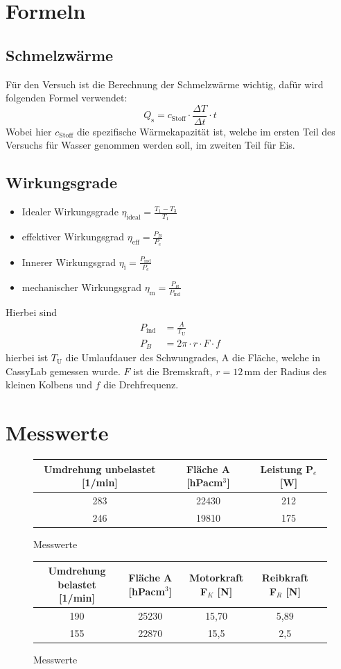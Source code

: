 \documentclass[fontsize=12pt]{scrartcl}
\begin{document}
\section{Formeln}

\subsection{Schmelzwärme}
Für den Versuch ist die Berechnung der Schmelzwärme wichtig, dafür wird folgenden Formel verwendet:
\begin{equation}
Q_{\text{s}} = c_{\text{Stoff}}\cdot \frac{\Delta T}{\Delta t} \cdot t
\end{equation}
Wobei hier $c_{\text{Stoff}}$ die spezifische Wärmekapazität ist, welche im ersten Teil des Versuchs für Wasser genommen werden soll, im zweiten Teil für Eis. 
\subsection{Wirkungsgrade}
\begin{itemize}
\item Idealer Wirkungsgrade $\eta_{\text{ideal}}= \frac{T_1 -T_3}{T_1}$
\item effektiver Wirkungsgrad $\eta_{\text{eff}}= \frac{P_B}{P_e}$
\item Innerer Wirkungsgrad $\eta_{\text{i}}=\frac{P_{\text{ind}}}{P_e}$
\item mechanischer Wirkungsgrad $\eta_{\text{m}} = \frac{P_B}{P_{\text{ind}}}$
\end{itemize}
Hierbei sind 
\begin{align*}
P_{\text{ind}}& = \frac{A}{T_{\text{U}}} \\
P_B &= 2\pi \cdot  r \cdot F \cdot f
\end{align*}
hierbei ist $T_{\text{U}}$ die Umlaufdauer des Schwungrades, A die Fläche, welche in CassyLab gemessen wurde. $F$ ist die Bremskraft, $r=12\,\text{mm}$ der Radius des kleinen Kolbens und $f$ die Drehfrequenz.
\newpage
\section{ Messwerte}
\begin{figure}[H]
\centering
\caption{Messwerte }
\begin{tabular}{|c|c|c|} \hline
Umdrehung unbelastet [1/min] & Fläche A [hPacm$^3$] & Leistung P$_e$ [W] \\ \hline
283 & 22430 & 212 \\ \hline
246 & 19810 & 175  \\ \hline
\end{tabular}				 
\end{figure}
\begin{figure}[H]
\centering
\caption{Messwerte }
\begin{tabular}{|c|c|c|c|c|} \hline
Umdrehung belastet [1/min] & Fläche A [hPacm$^3$] & Motorkraft F$_K$ [N]  & Reibkraft F$_R$ [N]\\ \hline
190 & 25230 & 15,70 & 5,89 \\ \hline
155 &22870 & 15,5 &2,5 \\ \hline
\end{tabular}				 
\end{figure}
\end{document}
